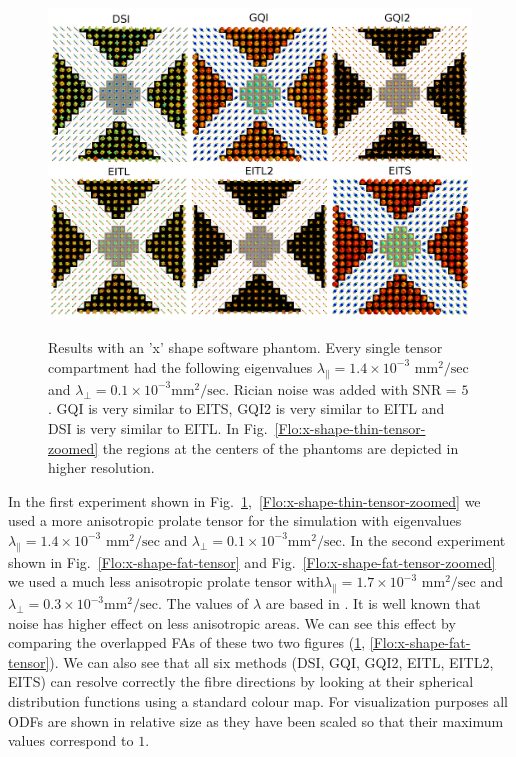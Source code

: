 \documentclass{bioinfo}
\begin{document}
%
\begin{figure}
[th!]

\begin{centering}
\includegraphics[scale=0.14]{figures/software_phantom_comparisons_rician_05}
\par\end{centering}

\caption{Results with an 'x' shape software phantom. Every single tensor compartment
had the following eigenvalues $\lambda_{\parallel}=1.4\times10^{-3}$
\foreignlanguage{british}{$\textrm{mm}^{2}/\textrm{sec}$} and $\lambda_{\perp}=0.1\times10^{-3}\textrm{mm}^{2}/\textrm{sec}$.
Rician noise was added with SNR = $5$. GQI is very similar to EITS,
GQI2 is very similar to EITL and DSI is very similar to EITL. In Fig.~\ref{Flo:x-shape-thin-tensor-zoomed}
the regions at the centers of the phantoms are depicted in higher
resolution.}


\centering{}\label{Flo:x-shape-thin-tensor}
\end{figure}


In the first experiment shown in Fig.~\ref{Flo:x-shape-thin-tensor},~\ref{Flo:x-shape-thin-tensor-zoomed}
we used a more anisotropic prolate tensor for the simulation with
eigenvalues $\lambda_{\parallel}=1.4\times10^{-3}$ \foreignlanguage{british}{$\textrm{mm}^{2}/\textrm{sec}$}
and $\lambda_{\perp}=0.1\times10^{-3}\textrm{mm}^{2}/\textrm{sec}$.
In the second experiment shown in Fig.~\ref{Flo:x-shape-fat-tensor}
and Fig.~\ref{Flo:x-shape-fat-tensor-zoomed} we used a much less
anisotropic prolate tensor with$\lambda_{\parallel}=1.7\times10^{-3}$
\foreignlanguage{british}{$\textrm{mm}^{2}/\textrm{sec}$} and $\lambda_{\perp}=0.3\times10^{-3}\textrm{mm}^{2}/\textrm{sec}$.
The values of $\lambda$ are based in \cite{Canales-Rodriguez2009}.
It is well known that noise has higher effect on less anisotropic
areas. We can see this effect by comparing the overlapped FAs of these
two two figures (\ref{Flo:x-shape-thin-tensor}, \ref{Flo:x-shape-fat-tensor}).
We can also see that all six methods (DSI, GQI, GQI2, EITL, EITL2,
EITS) can resolve correctly the fibre directions by looking at their
spherical distribution functions using a standard colour map. For
visualization purposes all ODFs are shown in relative size as they
have been scaled so that their maximum values correspond to $1$. 
\end{document}
